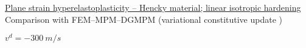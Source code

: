 
%       

\begin{frame}
  
\end{frame}

\begin{frame}{\href{section4/animation/hyperelastoplasticity/video.mp4}{Plane strain hyperelastoplasticity -- Hencky material; linear isotropic hardening}}
  \footnotesize Comparison with FEM--MPM--DGMPM (variational constitutive update \cite{LaurentVariational})
  \begin{overprint}
    \vspace{0.25cm}
    \begin{center}
      
      \footnotesize $v^d = -300 \: m/s$
    \end{center}
    \vspace{0.cm}
    \begin{center}
    \end{center}
  \end{overprint}
\end{frame}
